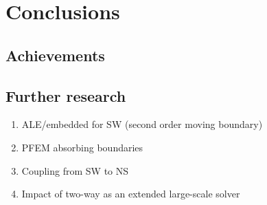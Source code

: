 
\chapter{Conclusions}
\label{conclusions}




\section{Achievements}





\section{Further research}


\begin{enumerate}
    \item ALE/embedded for SW (second order moving boundary)
    \item PFEM absorbing boundaries
    \item Coupling from SW to NS
    \item Impact of two-way as an extended large-scale solver
\end{enumerate}

